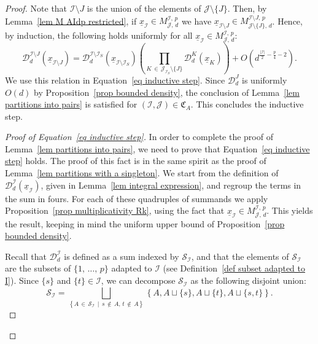 \documentclass[AHL,Unicode,longabstracts,published]{cedram}
\newcommand{\D}{\mathcal{D}}
\newcommand{\I}{\mathcal{I}}
\newcommand{\J}{\mathcal{J}}
\newcommand{\clS}{\mathcal{S}}
\newcommand{\frkC}{\mathfrak{C}}
\newcommand{\norm}[1]{\left\lvert #1 \right\rvert}
\begin{document}
\begin{proof}
\pagebreak
Note that $\I \setminus J$ is the union of the elements of $\J \setminus \{J\}$. Then, by Lemma~\ref{lem M AIdp restricted}, if $\underline{x}_\I \in M^{\I,\,p}_{\J,\,d}$ we have $\underline{x}_{\I \setminus J} \in M^{\I \setminus J,\,p}_{\J \setminus \{J\},\,d}$. Hence, by induction, the following holds uniformly for all $\underline{x}_\I \in M^{\I,\,p}_{\J,\,d}$:
\[
\D_d^{\I \setminus J}\left(\underline{x}_{\I \setminus J}\right) = \D_d^{\I \setminus \I_S}\left(\underline{x}_{\I \setminus \I_S}\right) \left(\prod_{K\,\in\,\J_{\I_S} \setminus \{J\}}\D_d^K\left(\underline{x}_K\right)\right) +O\left(d^{\frac{\norm{\I}}{2}-\frac{p}{4}-2}\right).
\]
We use this relation in Equation~\eqref{eq inductive step}. Since $\D_d^J$ is uniformly $O(d)$ by Proposition~\ref{prop bounded density}, the conclusion of Lemma~\ref{lem partitions into pairs} is satisfied for $(\I,\J) \in \frkC_A$. This concludes the inductive step.

\begin{proof}[{Proof of Equation~\eqref{eq inductive step}}]
In order to complete the proof of Lemma~\ref{lem partitions into pairs}, we need to prove that Equation~\eqref{eq inductive step} holds. The proof of this fact is in the same spirit as the proof of Lemma~\ref{lem partitions with a singleton}. We start from the definition of $\D_d^\I(\underline{x}_\I)$, given in Lemma~\ref{lem integral expression}, and regroup the terms in the sum in fours. For each of these quadruples of summands we apply Proposition~\ref{prop multiplicativity Rk}, using the fact that $\underline{x}_\I \in M^{\I,\,p}_{\J,\,d}$. This yields the result, keeping in mind the uniform upper bound of Proposition~\ref{prop bounded density}.

Recall that $\D_d^\I$ is defined as a sum indexed by $\clS_\I$, and that the elements of $\clS_\I$ are the subsets of $\{1,\,\dots,\,p\}$ adapted to $\I$ (see Definition~\ref{def subset adapted to I}). Since $\{s\}$ and $\{t\} \in \I$, we can decompose $\clS_\I$ as the following disjoint union:
\[
\clS_\I = \bigsqcup_{\left\{A\,\in\,\clS_\I\,\mid\,s\,\notin\,A,\,t \,\notin\,A\right\} } \left\{A, A \sqcup \{s\}, A \sqcup \{t\}, A \sqcup \{s,t\}\right\}.
\]


\end{proof}
\end{proof}
\end{document}
